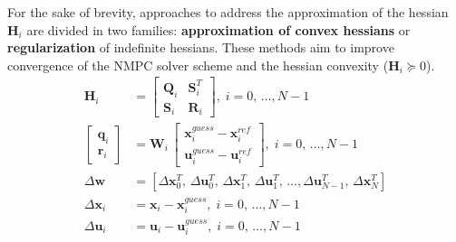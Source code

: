 For the sake of brevity, approaches to address the approximation of the hessian $\mathbf{H}_i$ are divided in two families: \textbf{approximation of convex hessians} or \textbf{regularization} of indefinite hessians. These methods aim to improve convergence of the NMPC solver scheme and the hessian convexity ($\mathbf{H}_i \succeq 0$).
\begin{subequations}\label{eq:qpdefinitions}
\begin{align}
\mathbf{H}_i &= \begin{bmatrix}
\mathbf{Q}_i & \mathbf{S}_i^T\\
\mathbf{S}_i & \mathbf{R}_i
\end{bmatrix},\; i = 0,\,\ldots,N-1 \label{subeq:qphessian} \\
\begin{bmatrix} \mathbf{q}_i \\ \mathbf{r}_i \end{bmatrix} &= \mathbf{W}_i \, \begin{bmatrix} \mathbf{x}_i^{guess} -  \mathbf{x}_i^{ref} \\  \mathbf{u}_i^{guess} -  \mathbf{u}_i^{ref} \end{bmatrix},\; i = 0,\,\ldots,N-1 \label{subeq:hessian2} \\
\Delta \mathbf{w} &= \left[\Delta \mathbf{x}^T_0, \,\Delta \mathbf{u}^T_0, \, \Delta \mathbf{x}^T_1, \,\Delta \mathbf{u}^T_1,\,\ldots, \Delta \mathbf{u}^T_{N-1},\, \Delta \mathbf{x}^T_N \right]  \label{subeq:qpoptvar} \\
\Delta \mathbf{x}_i &= \mathbf{x}_i - \mathbf{x}_i^{guess},\; i = 0,\,\ldots,N-1 \label{subeq:qpstates} \\
\Delta \mathbf{u}_i &= \mathbf{u}_i - \mathbf{u}_i^{guess},\; i = 0,\,\ldots,N-1\label{subeq:qpcontrols}
\end{align}
\end{subequations}

